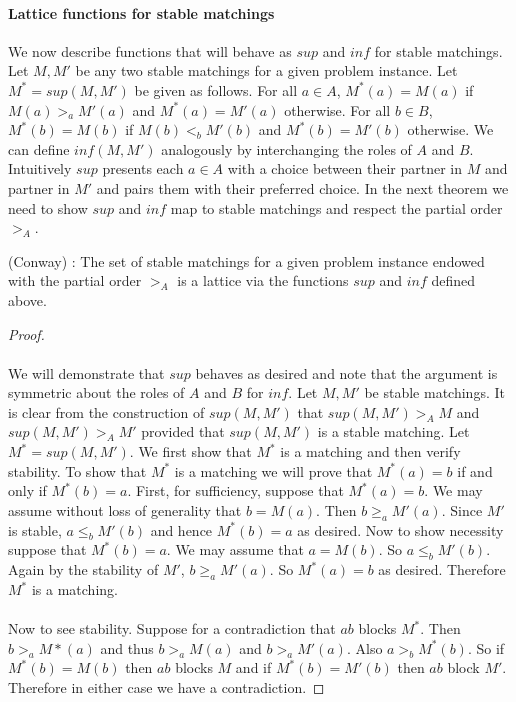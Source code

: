 \paragraph{Lattice functions for stable matchings} We now describe functions that will behave as $sup$ and $inf$ for stable matchings. Let $M, M'$ be any two stable matchings for a given problem instance. Let $M^* = sup(M,M')$ be given as follows. For all $a \in A$, $M^*(a) = M(a)$ if $M(a) >_a M'(a)$ and $M^*(a) = M'(a)$ otherwise. For all $b \in B$, $M^*(b) = M(b)$ if $M(b) <_b M'(b)$ and $M^*(b) = M'(b)$ otherwise. We can define $inf(M,M')$ analogously by interchanging the roles of $A$ and $B$. Intuitively $sup$  presents each $a \in A$ with a choice between their partner in $M$ and partner in $M'$ and pairs them with their preferred choice. In the next theorem we need to show $sup$ and $inf$ map to stable matchings and respect the partial order $>_A$.
\begin{theorem}(Conway)\label{theorem:lattice} \cite{knuthmariages}: The set of stable matchings for a given problem instance endowed with the partial order $>_A$ is a lattice via the functions $sup$ and $inf$ defined above.
\end{theorem}
\begin{proof}
\paragraph{}
We will demonstrate that $sup$ behaves as desired and note that the argument is symmetric about the roles of $A$ and $B$ for $inf$. Let $M, M'$ be stable matchings. It is clear from the construction of $sup(M,M')$ that $sup(M,M') >_A M$ and $sup(M,M') >_A M'$ provided that $sup(M,M')$ is a stable matching. Let $M^* = sup(M,M')$. We first show that $M^*$ is a matching and then verify stability. To show that $M^*$ is a matching we will prove that $M^*(a) = b$ if and only if $M^*(b) = a$. First, for sufficiency, suppose that $M^*(a) = b$.  We may assume without loss of generality that $b = M(a)$. Then $b \geq_a M'(a)$. Since $M'$ is stable, $a \leq_b M'(b)$ and hence $M^*(b) = a$ as desired. Now to show necessity suppose that $M^*(b) = a$. We may assume that $a = M(b)$. So $a \leq_b M'(b)$. Again by the stability of $M'$, $b \geq_a M'(a)$. So $M^*(a) = b$ as desired. Therefore $M^*$ is a matching. 
\paragraph{}
Now to see stability. Suppose for a contradiction that $ab$ blocks $M^*$. Then $b >_a M*(a)$ and thus $b>_a M(a)$ and $b >_a M'(a)$. Also $a >_b M^*(b)$. So if $M^*(b) = M(b)$ then $ab$ blocks $M$ and if $M^*(b) = M'(b)$ then $ab$ block $M'$. Therefore in either case we have  a contradiction. \end{proof}
